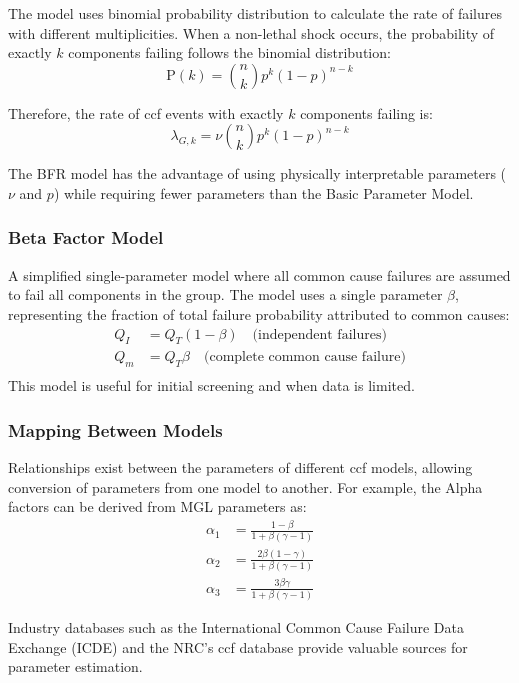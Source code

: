 The model uses binomial probability distribution to calculate the rate of failures with different multiplicities. When a non-lethal shock occurs, the probability of exactly $k$ components failing follows the binomial distribution:
\begin{equation}
\text{P}(k) = \binom{n}{k}p^k(1-p)^{n-k}
\end{equation}

Therefore, the rate of \acrshort{ccf} events with exactly $k$ components failing is:
\begin{equation}
\lambda_{G,k} = \nu\binom{n}{k}p^k(1-p)^{n-k}
\end{equation}

The BFR model has the advantage of using physically interpretable parameters ($\nu$ and $p$) while requiring fewer parameters than the Basic Parameter Model.

\subsubsection{Beta Factor Model}
A simplified single-parameter model where all common cause failures are assumed to fail all components in the group. The model uses a single parameter $\beta$, representing the fraction of total failure probability attributed to common causes:
\[
\begin{aligned}
Q_I &= Q_T(1-\beta) \quad \text{(independent failures)} \\
Q_m &= Q_T\beta \quad \text{(complete common cause failure)} \\
\end{aligned}
\]
This model is useful for initial screening and when data is limited.

\subsubsection{Mapping Between Models}
Relationships exist between the parameters of different \acrshort{ccf} models, allowing conversion of parameters from one model to another. For example, the Alpha factors can be derived from MGL parameters as:
\[
\begin{aligned}
\alpha_1 &= \frac{1-\beta}{1+\beta(\gamma-1)} \\
\alpha_2 &= \frac{2\beta(1-\gamma)}{1+\beta(\gamma-1)} \\
\alpha_3 &= \frac{3\beta\gamma}{1+\beta(\gamma-1)}
\end{aligned}
\]

Industry databases such as the International Common Cause Failure Data Exchange (ICDE) \cite{ICDE} and the NRC's \acrshort{ccf} database \cite{ma_ccf_2022} provide valuable sources for parameter estimation.
